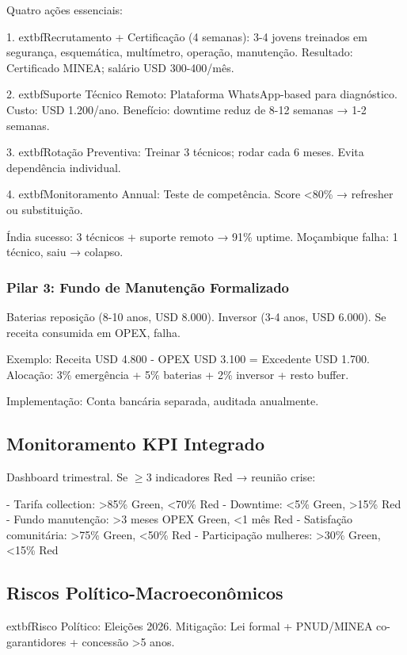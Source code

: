 \documentclass[12pt, a4paper]{article}
\begin{document}
{{{{{{{{{{{Quatro ações essenciais:

1. 	extbf{Recrutamento + Certificação (4 semanas)}: 3-4 jovens treinados em segurança, esquemática, multímetro, operação, manutenção. Resultado: Certificado MINEA; salário USD 300-400/mês.

2. 	extbf{Suporte Técnico Remoto}: Plataforma WhatsApp-based para diagnóstico. Custo: USD 1.200/ano. Benefício: downtime reduz de 8-12 semanas → 1-2 semanas.

3. 	extbf{Rotação Preventiva}: Treinar 3 técnicos; rodar cada 6 meses. Evita dependência individual.

4. 	extbf{Monitoramento Annual}: Teste de competência. Score <80\% → refresher ou substituição.

Índia sucesso: 3 técnicos + suporte remoto → 91\% uptime. Moçambique falha: 1 técnico, saiu → colapso.

\subsubsection{Pilar 3: Fundo de Manutenção Formalizado}

Baterias reposição (8-10 anos, USD 8.000). Inversor (3-4 anos, USD 6.000). Se receita consumida em OPEX, falha.

Exemplo: Receita USD 4.800 - OPEX USD 3.100 = Excedente USD 1.700. Alocação: 3\% emergência + 5\% baterias + 2\% inversor + resto buffer.

Implementação: Conta bancária separada, auditada anualmente.

\subsection{Monitoramento KPI Integrado}

Dashboard trimestral. Se $\geq$3 indicadores Red → reunião crise:

- Tarifa collection: >85\% Green, <70\% Red
- Downtime: <5\% Green, >15\% Red
- Fundo manutenção: >3 meses OPEX Green, <1 mês Red
- Satisfação comunitária: >75\% Green, <50\% Red
- Participação mulheres: >30\% Green, <15\% Red

\subsection{Riscos Político-Macroeconômicos}

	extbf{Risco Político}: Eleições 2026. Mitigação: Lei formal + PNUD/MINEA co-garantidores + concessão >5 anos.

}}}}}}}}}}}
\end{document}
